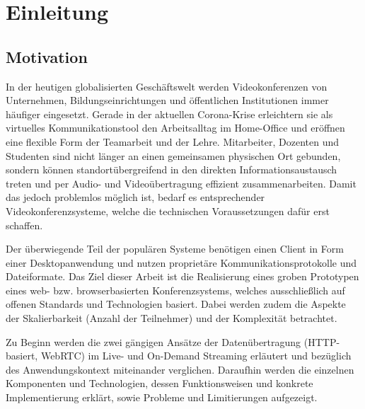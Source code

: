 
\section{Einleitung}
\label{sec:einleitung}

\subsection{Motivation}
\label{subsec:motivation}

In der heutigen globalisierten Geschäftswelt werden Videokonferenzen von Unternehmen, Bildungseinrichtungen und öffentlichen Institutionen immer häufiger eingesetzt.
Gerade in der aktuellen Corona-Krise erleichtern sie als virtuelles Kommunikationstool den Arbeitsalltag im Home-Office und eröffnen eine flexible
Form der Teamarbeit und der Lehre.
Mitarbeiter, Dozenten und Studenten sind nicht länger an einen gemeinsamen physischen Ort gebunden, sondern können
standortübergreifend in den direkten Informationsaustausch treten und per Audio- und Videoübertragung effizient zusammenarbeiten.
Damit das jedoch problemlos möglich ist, bedarf es entsprechender Videokonferenzsysteme, welche die technischen Voraussetzungen dafür erst schaffen.

Der überwiegende Teil der populären Systeme benötigen einen Client in Form einer Desktopanwendung und nutzen proprietäre Kommunikationsprotokolle und Dateiformate.
Das Ziel dieser Arbeit ist die Realisierung eines groben Prototypen eines web- bzw. browserbasierten Konferenzsystems, welches ausschließlich
auf offenen Standards und Technologien basiert.
Dabei werden zudem die Aspekte der Skalierbarkeit (Anzahl der Teilnehmer) und der Komplexität betrachtet.

Zu Beginn werden die zwei gängigen Ansätze der Datenübertragung (HTTP-basiert, WebRTC) im Live- und On-Demand Streaming erläutert
und bezüglich des Anwendungskontext miteinander verglichen.
Daraufhin werden die einzelnen Komponenten und Technologien, dessen Funktionsweisen und konkrete Implementierung erklärt,
sowie Probleme und Limitierungen aufgezeigt.

